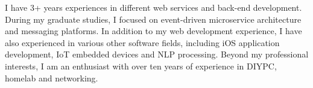 

\begin{cvparagraph}

I have 3+ years experiences in different web services and back-end development. During my graduate studies, I focused on event-driven microservice architecture and messaging platforms. In addition to my web development experience, I have also experienced in various other software fields, including iOS application development, IoT embedded devices and NLP processing. Beyond my professional interests, I am an enthusiast with over ten years of experience in DIYPC, homelab and networking. 
\end{cvparagraph}


